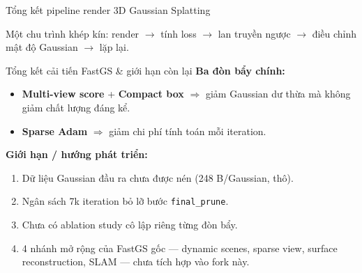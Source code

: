 \begin{frame}{Tổng kết pipeline render 3D Gaussian Splatting}
\centering
\footnotesize
{}
\vspace{2mm}

\normalsize
Một chu trình khép kín: render $\rightarrow$ tính loss $\rightarrow$ lan truyền ngược $\rightarrow$ điều chỉnh mật độ Gaussian $\rightarrow$ lặp lại.
\end{frame}

\begin{frame}{Tổng kết cải tiến FastGS \& giới hạn còn lại}
\textbf{Ba đòn bẩy chính:}
\begin{itemize}
    \item \textbf{Multi-view score} + \textbf{Compact box} $\Rightarrow$ giảm Gaussian dư thừa mà không giảm chất lượng đáng kể.
    \item \textbf{Sparse Adam} $\Rightarrow$ giảm chi phí tính toán mỗi iteration.
\end{itemize}
\vspace{2mm}
\textbf{Giới hạn / hướng phát triển:}
\begin{enumerate}
    \item Dữ liệu Gaussian đầu ra chưa được nén (248 B/Gaussian, thô).
    \item Ngân sách 7k iteration bỏ lỡ bước \texttt{final\_prune}.
    \item Chưa có ablation study cô lập riêng từng đòn bẩy.
    \item 4 nhánh mở rộng của FastGS gốc — dynamic scenes, sparse view, surface reconstruction, SLAM — chưa tích hợp vào fork này.
\end{enumerate}
\end{frame}

